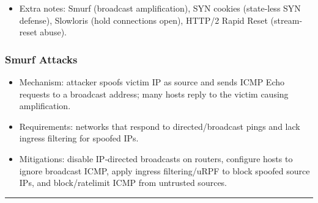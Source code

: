\documentclass{article}
\begin{document}
\begin{itemize}
  \item Extra notes: Smurf (broadcast amplification), SYN cookies (state‑less SYN defense), Slowloris (hold connections open), HTTP/2 Rapid Reset (stream-reset abuse).
\end{itemize}

\subsubsection{Smurf Attacks}
\begin{itemize}
  \item Mechanism: attacker spoofs victim IP as source and sends ICMP Echo requests to a broadcast address; many hosts reply to the victim causing amplification.
  \item Requirements: networks that respond to directed/broadcast pings and lack ingress filtering for spoofed IPs.
  \item Mitigations: disable IP‑directed broadcasts on routers, configure hosts to ignore broadcast ICMP, apply ingress filtering/uRPF to block spoofed source IPs, and block/ratelimit ICMP from untrusted sources.
\end{itemize}


\hrule
\end{document}
